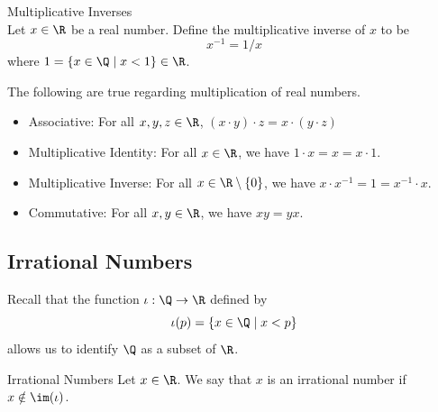 \documentclass[a4paper]{article}
\begin{document}
\begin{defn}{Multiplicative Inverses}{}\\
Let $x\in\R$ be a real number. Define the multiplicative inverse of $x$ to be $$x^{-1}=1/x$$ where $1=\{x\in\Q\;|\;x<1\}\in\R$. 
\end{defn}

\begin{prp}{}{} The following are true regarding multiplication of real numbers. 
\begin{itemize}
\item Associative: For all $x,y,z\in\R$, $(x\cdot y)\cdot z=x\cdot(y\cdot z)$
\item Multiplicative Identity: For all $x\in\R$, we have $1\cdot x=x=x\cdot 1$. 
\item Multiplicative Inverse: For all $x\in\R\setminus\{0\}$, we have $x\cdot x^{-1}=1=x^{-1}\cdot x$. 
\item Commutative: For all $x,y\in\R$, we have $xy=yx$. 
\end{itemize}
\end{prp}

\subsection{Irrational Numbers}
Recall that the function $\iota:\Q\to\R$ defined by $$\iota(p)=\{x\in\Q\;|\;x<p\}$$ allows us to identify $\Q$ as a subset of $\R$. 

\begin{defn}{Irrational Numbers}{} Let $x\in\R$. We say that $x$ is an irrational number if $x\notin\im(\iota)$. 
\end{defn}
\end{document}
